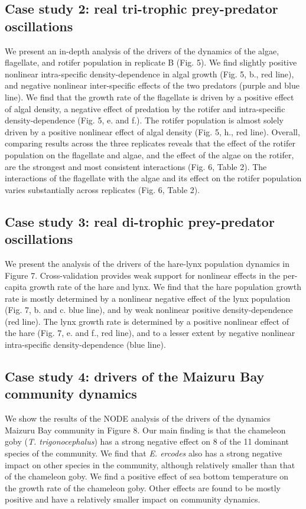 \documentclass[11pt, oneside]{article}
\begin{document}
\subsection{Case study 2: real tri-trophic prey-predator oscillations}

We present an in-depth analysis of the drivers of the dynamics of the algae, flagellate, and rotifer population in replicate B (Fig. 5).
We find slightly positive nonlinear intra-specific density-dependence in algal growth (Fig. 5, b., red line), and negative nonlinear inter-specific effects of the two predators (purple and blue line).
We find that the growth rate of the flagellate is driven by a positive effect of algal density, a negative effect of predation by the rotifer and intra-specific density-dependence (Fig. 5, e. and f.).
The rotifer population is almost solely driven by a positive nonlinear effect of algal density (Fig. 5, h., red line).
Overall, comparing results across the three replicates reveals that the effect of the rotifer population on the flagellate and algae, and the effect of the algae on the rotifer, are the strongest and most consistent interactions (Fig. 6, Table 2).
The interactions of the flagellate with the algae and its effect on the rotifer population varies substantially across replicates (Fig. 6, Table 2). 

\subsection{Case study 3: real di-trophic prey-predator oscillations}

We present the analysis of the drivers of the hare-lynx population dynamics in Figure 7.
Cross-validation provides weak support for nonlinear effects in the per-capita growth rate of the hare and lynx.
We find that the hare population growth rate is mostly determined by a nonlinear negative effect of the lynx population (Fig. 7, b. and c. blue line), and by weak nonlinear positive density-dependence (red line). 
The lynx growth rate is determined by a positive nonlinear effect of the hare (Fig. 7, e. and f., red line), and to a lesser extent by negative nonlinear intra-specific density-dependence (blue line).

\subsection{Case study 4: drivers of the Maizuru Bay community dynamics}

We show the results of the NODE analysis of the drivers of the dynamics Maizuru Bay community in Figure 8.
Our main finding is that the chameleon goby (\textit{T. trigonocephalus}) has a strong negative effect on 8 of the 11 dominant species of the community. 
We find that \textit{E. ercodes} also has a strong negative impact on other species in the community, although relatively smaller than that of the chameleon goby.
We find a positive effect of sea bottom temperature on the growth rate of the chameleon goby.
Other effects are found to be mostly positive and have a relatively smaller impact on community dynamics.
\end{document}
